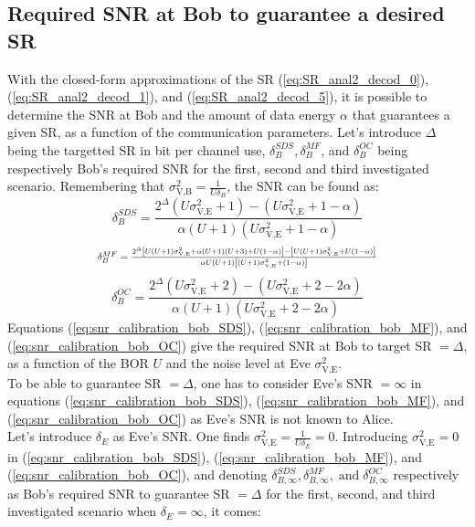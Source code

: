 \documentclass[12pt, draftclsnofoot, onecolumn]{IEEEtran}
\begin{document}
\subsection{Required SNR at Bob to guarantee a desired SR}
 \label{sec:required-snr-at-bob-for-a-targetted-sr}
With the closed-form approximations of the SR (\ref{eq:SR_anal2_decod_0}), (\ref{eq:SR_anal2_decod_1}), and (\ref{eq:SR_anal2_decod_5}), it is possible to determine the SNR at Bob and the amount of data energy $\alpha$ that guarantees a given SR, as a function of the communication parameters. Let's introduce $\Delta$ being the targetted SR in bit per channel use, $\delta_B^{SDS}, \delta_B^{MF}$, and $\delta_B^{OC}$ being respectively Bob's required SNR for the first, second and third investigated scenario. Remembering that $\sigma^2_{\text{V,B}} = \frac{1}{U\delta_{B}}$, the SNR can be found as:
\begin{equation}
\delta_{B}^{SDS} = \frac{2^\Delta (U\sigma_{\text{V,E}}^2+1) - (U\sigma_{\text{V,E}}^2+1-\alpha) }{\alpha(U+1)(U\sigma_{\text{V,E}}^2+1-\alpha)}
\label{eq:snr_calibration_bob_SDS}
\end{equation}
\begin{equation}
\resizebox{.65 \textwidth}{!} 
{
	$\delta_{B}^{MF} = \frac{2^\Delta \left[U(U+1)\sigma_{\text{V,E}}^2 + \alpha(U+1)(U+3)+U(1-\alpha) \right] - \left[ U(U+1)\sigma_{\text{V,E}}^2+U(1-\alpha)\right] }{\alpha U(U+1)\left[(U+1)\sigma_{\text{V,E}}^2+(1-\alpha)\right]}$
}
	\label{eq:snr_calibration_bob_MF}
\end{equation}
\begin{equation}
\delta_{B}^{OC} = \frac{2^\Delta  (U\sigma_{\text{V,E}}^2+2) - (U\sigma_{\text{V,E}}^2+2-2\alpha) }{ \alpha(U+1)(U\sigma_{\text{V,E}}^2+2-2\alpha)}
\label{eq:snr_calibration_bob_OC}
\end{equation}
Equations (\ref{eq:snr_calibration_bob_SDS}), (\ref{eq:snr_calibration_bob_MF}), and (\ref{eq:snr_calibration_bob_OC})  give the required SNR at Bob to target SR $=\Delta$, as a function of the BOR $U$ and the noise level at Eve $\sigma_{\text{V,E}}^2$. \\
To be able to guarantee SR $=\Delta$, one has to consider Eve's SNR $= \infty$ in equations (\ref{eq:snr_calibration_bob_SDS}), (\ref{eq:snr_calibration_bob_MF}), and (\ref{eq:snr_calibration_bob_OC}) as Eve's SNR is not known to Alice.\\
Let's introduce $\delta_E$ as Eve's SNR. One finds $\sigma^2_{\text{V,E}} = \frac{1}{U\delta_{E}} = 0$. Introducing $ \sigma_{\text{V,E}}^2 = 0$ in (\ref{eq:snr_calibration_bob_SDS}), (\ref{eq:snr_calibration_bob_MF}), and (\ref{eq:snr_calibration_bob_OC}), and denoting $\delta_{B,\infty}^{SDS}, \delta_{B,\infty}^{MF}, \; \text{and}\;  \delta_{B,\infty}^{OC}$ respectively as Bob's required SNR to guarantee SR $=\Delta$ for the first, second, and third investigated scenario when $\delta_E = \infty$, it comes:
\end{document}
